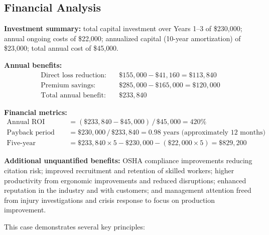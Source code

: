 \documentclass[11pt,openany]{book}
\begin{document}
\subsection{Financial Analysis}
\label{subsec:riverside-financial}

\textbf{Investment summary:} total capital investment over Years 1--3 of
\$230{,}000; annual ongoing costs of \$22{,}000; annualized capital (10-year
amortization) of \$23{,}000; total annual cost of \$45{,}000.

\textbf{Annual benefits:}
\begin{align*}
\text{Direct loss reduction:} \quad & \$155{,}000 - \$41{,}160 = \$113{,}840 \\
\text{Premium savings:} \quad & \$285{,}000 - \$165{,}000 = \$120{,}000 \\
\text{Total annual benefit:} \quad & \$233{,}840
\end{align*}

\textbf{Financial metrics:}
\begin{align*}
\text{Annual ROI} &= (\$233{,}840 - \$45{,}000)\,/\,\$45{,}000 = 420\% \\
\text{Payback period} &= \$230{,}000\,/\,\$233{,}840 = 0.98
  \text{ years (approximately 12 months)} \\
\text{Five-year cumulative savings} &= \$233{,}840 \times 5 - \$230{,}000 -
  (\$22{,}000 \times 5) = \$829{,}200
\end{align*}

\textbf{Additional unquantified benefits:} OSHA compliance improvements
reducing citation risk; improved recruitment and retention of skilled workers;
higher productivity from ergonomic improvements and reduced disruptions;
enhanced reputation in the industry and with customers; and management
attention freed from injury investigations and crisis response to focus on
production improvement.

This case demonstrates several key principles:
\end{document}
